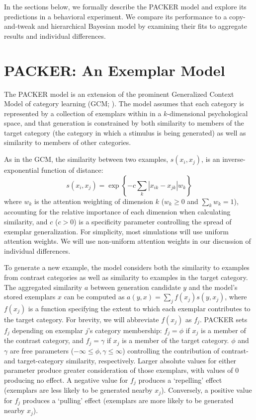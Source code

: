 \documentclass[10pt,letterpaper]{article}
\begin{document}
In the sections below, we formally describe the PACKER model and explore its predictions in a behavioral experiment. We compare its performance to a copy-and-tweak and hierarchical Bayesian model by examining their fits to aggregate results and individual differences.

\section{PACKER: An Exemplar Model}

The PACKER model is an extension of the prominent Generalized Context Model of category learning (GCM; \citealp{nosofsky1984choice}). The model assumes that each category is represented by a collection of exemplars within in a $k$-dimensional psychological space, and that generation is constrained by both similarity to members of the target category (the category in which a stimulus is being generated) as well as similarity to members of other categories. 

As in the GCM, the similarity between two examples, $s\left(x_i, x_j\right)$, is an inverse-exponential function of distance:
\begin{equation}
  s\left(x_i,x_j\right) = \exp \left\{ -c \sum_{k}{ \left| x_{ik} - x_{jk} \right|}w_k \right\}
  \label{eq:similarity}
\end{equation}
where $w_k$ is the attention weighting of dimension $k$ ($w_k \geq 0$ and $\sum_k{w_k} = 1$), accounting for the relative importance of each dimension when calculating similarity, and $c$ ($c>0$) is a specificity parameter controlling the spread of exemplar generalization. For simplicity, most simulations will use uniform attention weights. We will use non-uniform attention weights in our discussion of individual differences.  

To generate a new example, the model considers both the similarity to examples from contrast categories as well as similarity to examples in the target category. The aggregated similarity $a$ between generation candidate $y$ and the model's stored exemplars $x$ can be computed as $a(y, x) = \sum_j{f(x_j) s(y, x_j)}$, where $f(x_j)$ is a function specifying the extent to which each exemplar contributes to the target category. For brevity, we will abbreviate $f(x_j)$ as $f_j$. PACKER sets $f_j$ depending on exemplar $j$'s category membership: $f_j = \phi$ if $x_j$ is a member of the contrast category, and $f_j = \gamma$ if $x_j$ is a member of the target category. $\phi$ and $\gamma$ are free parameters ($-\infty \leq \phi, \gamma \leq \infty$) controlling the contribution of contrast- and target-category similarity, respectively. Larger absolute values for either parameter produce greater consideration of those exemplars, with values of 0 producing no effect. A negative value for $f_j$ produces a `repelling' effect (exemplars are less likely to be generated nearby $x_j$). Conversely, a positive value for $f_j$ produces a `pulling' effect (exemplars are more likely to be generated nearby $x_j$). 
\end{document}
